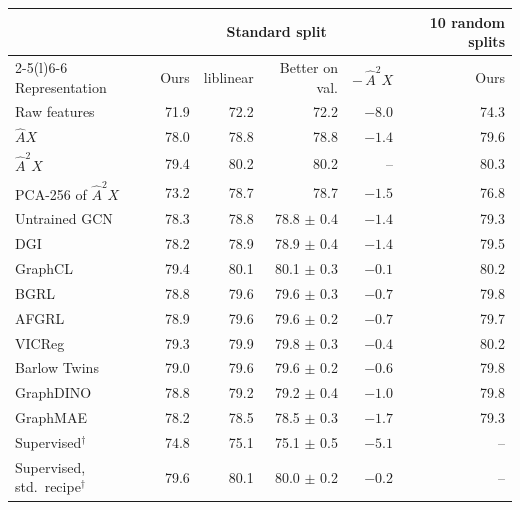 \begin{tabular}{@{}lrrrrr@{}}
\toprule
 & \multicolumn{4}{c}{Standard split} & 10 random splits \\
\cmidrule(lr){2-5}\cmidrule(l){6-6}
Representation & Ours & liblinear & Better on val. & $-\,\hat A^2X$ & Ours \\
\midrule
Raw features & 71.9 & 72.2 & 72.2 & $-8.0$ & 74.3 \\
$\hat AX$ & 78.0 & 78.8 & 78.8 & $-1.4$ & 79.6 \\
$\hat A^2X$ & 79.4 & 80.2 & 80.2 & -- & 80.3 \\
PCA-256 of $\hat A^2X$ & 73.2 & 78.7 & 78.7 & $-1.5$ & 76.8 \\
\midrule
Untrained GCN & 78.3 & 78.8 & 78.8 $\pm$ 0.4 & $-1.4$ & 79.3 \\
DGI & 78.2 & 78.9 & 78.9 $\pm$ 0.4 & $-1.4$ & 79.5 \\
GraphCL & 79.4 & 80.1 & 80.1 $\pm$ 0.3 & $-0.1$ & 80.2 \\
BGRL & 78.8 & 79.6 & 79.6 $\pm$ 0.3 & $-0.7$ & 79.8 \\
AFGRL & 78.9 & 79.6 & 79.6 $\pm$ 0.2 & $-0.7$ & 79.7 \\
VICReg & 79.3 & 79.9 & 79.8 $\pm$ 0.3 & $-0.4$ & 80.2 \\
Barlow Twins & 79.0 & 79.6 & 79.6 $\pm$ 0.2 & $-0.6$ & 79.8 \\
GraphDINO & 78.8 & 79.2 & 79.2 $\pm$ 0.4 & $-1.0$ & 79.8 \\
GraphMAE & 78.2 & 78.5 & 78.5 $\pm$ 0.3 & $-1.7$ & 79.3 \\
\midrule
Supervised$^\dagger$ & 74.8 & 75.1 & 75.1 $\pm$ 0.5 & $-5.1$ & -- \\
Supervised, std.\ recipe$^\dagger$ & 79.6 & 80.1 & 80.0 $\pm$ 0.2 & $-0.2$ & -- \\
\bottomrule
\end{tabular}
